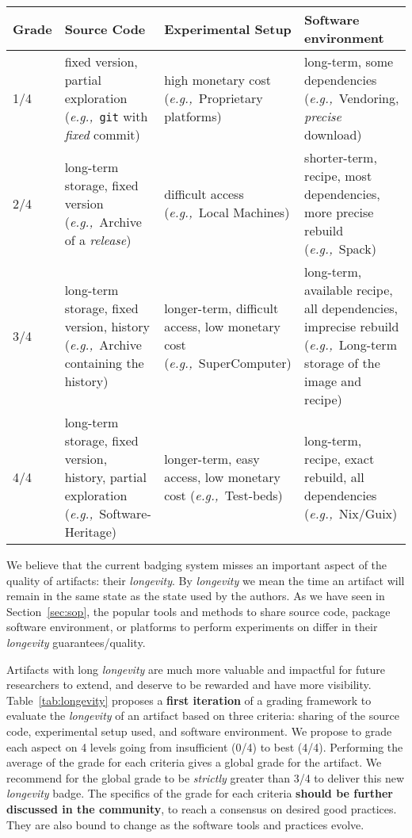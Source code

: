 \documentclass[sigconf,natbib=false]{acmart}
\newcommand{\eg}{\emph{e.g.,}}
\begin{document}
\begin{table*}
  \caption{\label{tab:longevity}Proposition of grading framework for evaluating the \emph{longevity} of an artifact.}
  \centering
    \begin{tabularx}{\textwidth}{l X X X}
  \toprule
      Grade & Source Code &  Experimental Setup & Software environment \\
  \midrule
      1/4 & fixed version, partial exploration (\eg\ \texttt{git} with \emph{fixed} commit) &  high monetary cost (\eg\ Proprietary platforms) & long-term, some dependencies (\eg\ Vendoring, \emph{precise} download) \\
       \midrule
      2/4 & long-term storage, fixed version (\eg\ Archive of a \emph{release}) & difficult access (\eg\ Local Machines) & shorter-term, recipe, most dependencies, more precise rebuild (\eg\ Spack) \\
       \midrule
      3/4 & long-term storage, fixed version, history (\eg\ Archive containing the history) & longer-term, difficult access, low monetary cost (\eg\ SuperComputer) & long-term, available recipe, all dependencies, imprecise rebuild (\eg\ Long-term storage of the image and recipe) \\
       \midrule
      4/4 & long-term storage, fixed version, history, partial exploration (\eg\ Software-Heritage) & longer-term, easy access, low monetary cost (\eg\ Test-beds) & long-term, recipe, exact rebuild, all dependencies (\eg\ Nix/Guix) \\
  \bottomrule
  \end{tabularx}
\end{table*}

We believe that the current badging system misses an important aspect of the quality of artifacts: their \emph{longevity}.
By \emph{longevity} we mean the time an artifact will remain in the same state as the state used by the authors.
As we have seen in Section\ \ref{sec:sop}, the popular tools and methods to share source code, package software environment, or platforms to perform experiments on differ in their \emph{longevity} guarantees/quality.

Artifacts with long \emph{longevity} are much more valuable and impactful for future researchers to extend, and deserve to be rewarded and have more visibility.
Table\ \ref{tab:longevity} proposes a \textbf{first iteration} of a grading framework to evaluate the \emph{longevity} of an artifact based on three criteria: sharing of the source code, experimental setup used, and software environment.
We propose to grade each aspect on 4 levels going from insufficient (0/4) to best (4/4).
Performing the average of the grade for each criteria gives a global grade for the artifact.
We recommend for the global grade to be \emph{strictly} greater than 3/4 to deliver this new \emph{longevity} badge.
  The specifics of the grade for each criteria \textbf{should be further discussed in the community}, to reach a consensus on desired good practices.
They are also bound to change as the software tools and practices evolve.
\end{document}

